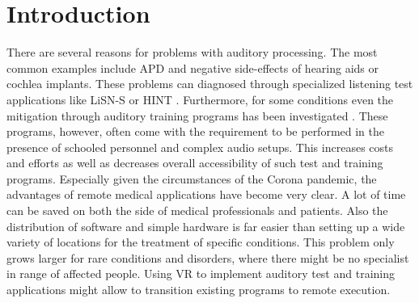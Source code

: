 \documentclass[a4paper,11pt]{article}%
\renewcommand{\\}{\vspace*{0.5\baselineskip} \newline}
\begin{document}
\newpage




\section{Introduction}
There are several reasons for problems with auditory processing. The most common examples include \ac{APD} and negative side-effects of hearing aids or cochlea implants. These problems can diagnosed through specialized listening test applications like \ac{LiSN-S} \cite{Cameron2007} or \ac{HINT} \cite{Nilsson1994}. Furthermore, for some conditions even the mitigation through auditory training programs has been investigated \cite{Tyler2010}\cite{Cameron2011}. These programs, however, often come with the requirement to be performed in the presence of schooled personnel and complex audio setups. This increases costs and efforts as well as decreases overall accessibility of such test and training programs. Especially given the circumstances of the Corona pandemic, the advantages of remote medical applications have become very clear. A lot of time can be saved on both the side of medical professionals and patients. Also the distribution of software and simple hardware is far easier than setting up a wide variety of locations for the treatment of specific conditions. This problem only grows larger for rare conditions and disorders, where there might be no specialist in range of affected people. Using \ac{VR} to implement auditory test and training applications might allow to transition existing programs to remote execution.


\end{document}
